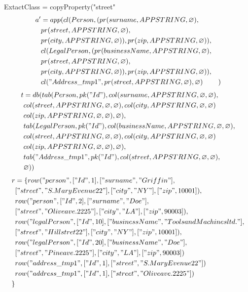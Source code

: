 \documentclass[11pt]{article}
\begin{document}
\newpage
ExtactClass = copyProperty("street"
\hline
\begin{align*}
a' &= app(cl(Person, (pr(surname, APPSTRING, \varnothing), \\
& pr(street, APPSTRING, \varnothing), \\
& pr(city, APPSTRING, \varnothing)), pr(zip, APPSTRING, \varnothing)), \\
& cl(LegalPerson, (pr(businessName, APPSTRING, \varnothing), \\
& pr(street, APPSTRING, \varnothing), \\
& pr(city, APPSTRING, \varnothing)), pr(zip, APPSTRING, \varnothing)), \\
& cl("Address\_tmp1", pr(street, APPSTRING, \varnothing) , \varnothing)
& )
\end{align*}
\begin{align*}
t &= db(tab(Person, pk("Id"), col(surname, APPSTRING, \varnothing, \varnothing), \\
& col(street, APPSTRING, \varnothing, \varnothing), col(city, APPSTRING, \varnothing, \varnothing) \\
& col(zip, APPSTRING, \varnothing, \varnothing), \varnothing), \\
& tab(LegalPerson, pk("Id"),  col(businessName, APPSTRING, \varnothing, \varnothing), \\
& col(street, APPSTRING, \varnothing, \varnothing), col(city, APPSTRING, \varnothing, \varnothing) \\
& col(zip, APPSTRING, \varnothing, \varnothing), \varnothing), \\
& tab("Address\_tmp1", pk("Id"), col(street, APPSTRING, \varnothing, \varnothing),\\
& \varnothing)) 
\end{align*}
\begin{align*}
r &= \{ row("person", ["Id", 1], ["surname", "Griffin"], \\
& ["street", "S. Mary Evenue 22"], ["city", "NY"], ["zip", 10001]), \\
& row("person", ["Id", 2], ["surname", "Doe"], \\
& ["street", "Olive ave. 2225"], ["city", "LA"], ["zip", 90003]), \\
& row("legalPerson", ["Id", 10], ["businessName", "Tools and Machines ltd."], \\
& ["street", "Hill stret 22"], ["city", "NY"], ["zip", 10001]), \\
& row("legalPerson", ["Id", 20], ["businessName", "Doe"], \\
& ["street", "Pine ave. 2225"], ["city", "LA"], ["zip", 90003])\\
& row("address\_tmp1", ["Id", 1], ["street", "S. Mary Evenue 22"]) \\
& row("address\_tmp1", ["Id", 1], ["street", "Olive ave. 2225"] )\\
\}
\end{align*}
\end{document}
